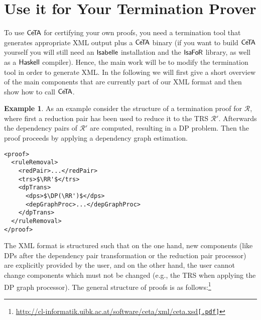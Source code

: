 \documentclass[a4paper,final]{easychair}
\theoremstyle{definition}
\newtheorem{example}{Example}[section]
\newcommand\formatID[1]{\ensuremath{{\sf#1}}}
\newcommand\CeTA{\formatID{C\kern-0.10exe\kern-0.40exT\kern-0.40exA}}
\newcommand\Haskell{\formatID{Haskell}}
\newcommand\Isabelle{\formatID{Isabelle}}
\newcommand\IsaFoR{\formatID{Isa\kern-0.10exF\kern-0.10exo\kern-0.10exR}}
\newcommand\DP{\mathsf{DP}}
\newcommand\RR{\mathcal{R}}
\begin{document}
\section{Use it for Your Termination Prover}
\label{sec:integration}
To use \CeTA{} for certifying your own proofs, you need a termination tool that
generates appropriate XML output plus a \CeTA{} binary (if you want to build
\CeTA{} yourself you will still need an \Isabelle{} installation and the
\IsaFoR{} library, as well as a \Haskell{} compiler). Hence, the main work will
be to modify the termination tool in order to generate XML. In the following we
will first give a short overview of the main components that are currently part
of our XML format and then show how to call \CeTA.
\begin{example}
As an example consider the structure of a termination proof for $\RR$,
where first a reduction pair has been used to reduce it to the TRS $\RR'$.
Afterwards the dependency pairs of $\RR'$ are computed, resulting in a DP
\pagebreak
problem. Then the proof proceeds by applying a dependency graph estimation.
\begin{lstlisting}[style=xml]
<proof>
  <ruleRemoval>
    <redPair>...</redPair>
    <trs>$\RR'$</trs>
    <dpTrans>
      <dps>$\DP(\RR')$</dps>
      <depGraphProc>...</depGraphProc>
    </dpTrans>
  </ruleRemoval>
</proof>
\end{lstlisting}
\end{example}
The XML format is structured such that on the one hand, new components (like DPs
after the dependency pair transformation or the reduction pair processor) are
explicitly provided by the user, and on the other hand, the user cannot change
components which must not be changed (e.g., the TRS when applying the DP graph
processor). The general structure of proofs is as
follows:\footnote{\url{http://cl-informatik.uibk.ac.at/software/ceta/xml/ceta.xsd}\href{http://cl-informatik.uibk.ac.at/software/ceta/xml/ceta.xsd.pdf}{\texttt{[.pdf]}}}
\end{document}
